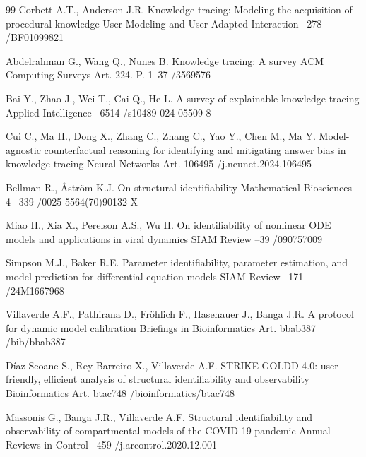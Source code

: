 \documentclass[blind]{psta}
\begin{document}
\FloatBarrier
\begin{thebibliography}{99}
\by Corbett A.T., Anderson J.R.
\paper Knowledge tracing: Modeling the acquisition of procedural knowledge
\jour User Modeling and User-Adapted Interaction
--278
/BF01099821

\by Abdelrahman G., Wang Q., Nunes B.
\paper Knowledge tracing: A survey
\jour ACM Computing Surveys
\miscnote Art. 224. P. 1–37
/3569576

\by Bai Y., Zhao J., Wei T., Cai Q., He L.
\paper A survey of explainable knowledge tracing
\jour Applied Intelligence
--6514
/s10489-024-05509-8

\by Cui C., Ma H., Dong X., Zhang C., Zhang C., Yao Y., Chen M., Ma Y.
\paper Model-agnostic counterfactual reasoning for identifying and mitigating answer bias in knowledge tracing
\jour Neural Networks
\miscnote Art. 106495
/j.neunet.2024.106495

\by Bellman R., Åström K.J.
\paper On structural identifiability
\jour Mathematical Biosciences
–4
--339
/0025-5564(70)90132-X

\by Miao H., Xia X., Perelson A.S., Wu H.
\paper On identifiability of nonlinear ODE models and applications in viral dynamics
\jour SIAM Review
--39
/090757009

\by Simpson M.J., Baker R.E.
\paper Parameter identifiability, parameter estimation, and model prediction for differential equation models
\jour SIAM Review
--171
/24M1667968

\by Villaverde A.F., Pathirana D., Fröhlich F., Hasenauer J., Banga J.R.
\paper A protocol for dynamic model calibration
\jour Briefings in Bioinformatics
\miscnote Art. bbab387
/bib/bbab387

\by Díaz-Seoane S., Rey Barreiro X., Villaverde A.F.
\paper STRIKE-GOLDD 4.0: user-friendly, efficient analysis of structural identifiability and observability
\jour Bioinformatics
\miscnote Art. btac748
/bioinformatics/btac748

\by Massonis G., Banga J.R., Villaverde A.F.
\paper Structural identifiability and observability of compartmental models of the COVID-19 pandemic
\jour Annual Reviews in Control
--459
/j.arcontrol.2020.12.001


\end{thebibliography}
\end{document}
